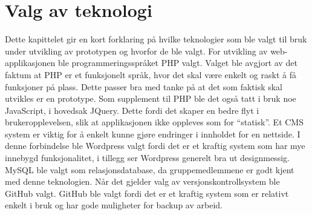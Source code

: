 \section*{Valg av teknologi}
Dette kapittelet gir en kort forklaring på hvilke teknologier som ble valgt til bruk under utvikling av prototypen og hvorfor de ble valgt. For utvikling av web-applikasjonen ble programmeringsspråket PHP valgt. Valget ble avgjort av det faktum at PHP er et funksjonelt språk, hvor det skal være enkelt og raskt å få funksjoner på plass. Dette passer bra med tanke på at det som faktisk skal utvikles er en prototype. Som supplement til PHP ble det også tatt i bruk noe JavaScript, i hovedsak JQuery. Dette fordi det skaper en bedre flyt i brukeropplevelsen, slik at applikasjonen ikke oppleves som for ``statisk''. Et CMS system er viktig for å enkelt kunne gjøre endringer i innholdet for en nettside. I denne forbindelse ble Wordpress valgt fordi det er et kraftig system som har mye innebygd funksjonalitet, i tillegg ser Wordpress generelt bra ut designmessig.\\

MySQL ble valgt som relasjonsdatabase, da gruppemedlemmene er godt kjent med denne teknologien. Når det gjelder valg av versjonskontrollsystem ble GitHub valgt. GitHub ble valgt fordi det er et kraftig system som er relativt enkelt i bruk og har gode muligheter for backup av arbeid.
